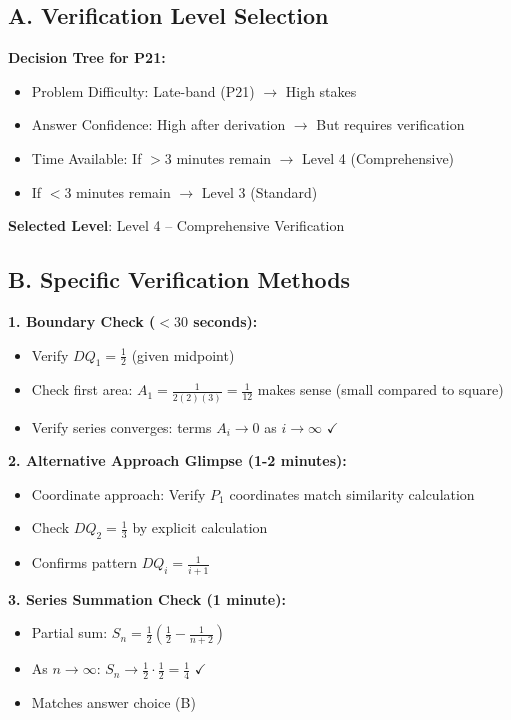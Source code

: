 \documentclass[]{article}
\begin{document}
\begin{verificationbox}
\subsection*{A. Verification Level Selection}

\textbf{Decision Tree for P21:}
\begin{itemize}
    \item Problem Difficulty: Late-band (P21) $\rightarrow$ High stakes
    \item Answer Confidence: High after derivation $\rightarrow$ But requires verification
    \item Time Available: If $>3$ minutes remain $\rightarrow$ Level 4 (Comprehensive)
    \item If $<3$ minutes remain $\rightarrow$ Level 3 (Standard)
\end{itemize}

\textbf{Selected Level}: Level 4 -- Comprehensive Verification

\subsection*{B. Specific Verification Methods}

\textbf{1. Boundary Check ($<30$ seconds):}
\begin{itemize}
    \item Verify $DQ_1 = \frac{1}{2}$ (given midpoint)
    \item Check first area: $A_1 = \frac{1}{2(2)(3)} = \frac{1}{12}$ makes sense (small compared to square)
    \item Verify series converges: terms $A_i \to 0$ as $i \to \infty$ $\checkmark$
\end{itemize}

\textbf{2. Alternative Approach Glimpse (1-2 minutes):}
\begin{itemize}
    \item Coordinate approach: Verify $P_1$ coordinates match similarity calculation
    \item Check $DQ_2 = \frac{1}{3}$ by explicit calculation
    \item Confirms pattern $DQ_i = \frac{1}{i+1}$
\end{itemize}

\textbf{3. Series Summation Check (1 minute):}
\begin{itemize}
    \item Partial sum: $S_n = \frac{1}{2}\left(\frac{1}{2} - \frac{1}{n+2}\right)$
    \item As $n \to \infty$: $S_n \to \frac{1}{2} \cdot \frac{1}{2} = \frac{1}{4}$ $\checkmark$
    \item Matches answer choice (B)
\end{itemize}


\end{verificationbox}
\end{document}

